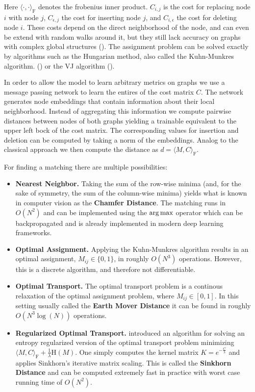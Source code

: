 \vspace{.2cm}

Here $\langle \cdot, \cdot \rangle_\mathrm{F}$ denotes the frobenius inner product. $C_{i, j}$ is the cost for replacing node $i$ with node $j$, $C_{\epsilon, j}$ the cost for inserting node $j$, and $C_{i, \epsilon}$ the cost for deleting node $i$. These costs depend on the direct neighborhood of the node, and can even be extend with random walks around it, but they still lack accuracy on graphs with complex global structures (\citealp{hungarian2009}). The assignment problem can be solved exactly by algorithms such as the Hungarian method, also called the Kuhn-Munkres algorithm. (\citealp{hungarian1955}) or the VJ algorithm (\citealp{vj1987}).

In order to allow the model to learn arbitrary metrics on graphs we use a message passing network to learn the entires of the cost matrix $C$. The network generates node embeddings that contain information about their local neighborhood. Instead of aggregating this information we compute pairwise distances between nodes of both graphs yielding a trainable equivalent to the upper left bock of the cost matrix. The corresponding values for insertion and deletion can be computed by taking a norm of the embeddings. Analog to the classical approach we then compute the distance as $ d = \langle M, C \rangle_\mathrm{F} $.

For finding a matching there are multiple possibilities:
\begin{itemize}
     \itemsep0em
     \item \textbf{Nearest Neighbor.} Taking the sum of the row-wise minima (and, for the sake of symmetry, the sum of the column-wise minima) yields what is known in computer vision as the \textbf{Chamfer Distance}. The matching runs in $O(N^2)$ and can be implemented using the $\operatorname*{arg\,max}$ operator which can be backpropagated and is already implemented in modern deep learning frameworks.
     \item \textbf{Optimal Assignment.} Applying the Kuhn-Munkres algorithm results in an optimal assignment, $M_{ij} \in \{0,1\}$, in roughly $O(N^3)$ operations. However, this is a discrete algorithm, and therefore not differentiable.
     \item \textbf{Optimal Transport.} The optimal transport problem is a continous relaxation of the optimal assignment problem, where $M_{ij} \in \left[ 0,1 \right]$. In this setting usually called the \textbf{Earth Mover Distance} it can be found in roughly $O(N^3 \log(N))$ operations.
     \item \textbf{Regularized Optimal Transport.} \cite{sinkhorn2013} introduced an algorithm for solving an entropy regularized version of the optimal transport problem minimizing $\langle M, C \rangle_\mathrm{F} + \frac{1}{\lambda} \mathrm{H}(M)$. One simply computes the kernel matrix $ K = e^{ -\frac{C}{\lambda}}$ and applies Sinkhorn’s iterative matrix scaling. This is called the \textbf{Sinkhorn Distance} and can be computed extremely fast in practice with worst case running time of $O(N^2)$.
\end{itemize}

